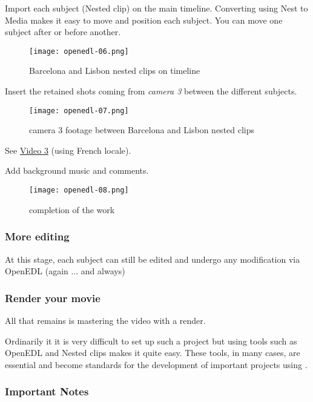 Import each subject (Nested clip) on the main timeline. Converting using Nest to Media makes it easy to move and position each subject. You can move one subject after or before another.

\begin{figure}[htpb]
	\centering
	\texttt{[image: openedl-06.png]}
	\caption{Barcelona and Lisbon nested clips on timeline}
	\label{fig:openedl-06}
\end{figure}

Insert the retained shots coming from \textit{camera 3} between the different subjects.

\begin{figure}[htpb]
	\centering
	\texttt{[image: openedl-07.png]}
	\caption{camera 3 footage between Barcelona and Lisbon nested clips}
	\label{fig:openedl-07}
\end{figure}

See \href{https://youtu.be/9Hz0a-1i3I8}{Video 3} (using French locale).

Add background music and comments.

\begin{figure}[htpb]
	\centering
	\texttt{[image: openedl-08.png]}
	\caption{completion of the work}
	\label{fig:openedl-08}
\end{figure}

\subsubsection*{More editing}
\label{ssub:more_editing}

At this stage, each subject can still be edited and undergo any modification via OpenEDL (again ... and always)

\subsubsection*{Render your movie}
\label{ssub:render_movie}

All that remains is mastering the video with a render.

Ordinarily it it is very difficult to set up such a project but using tools such as OpenEDL and Nested clips makes it quite easy. These tools, in many cases, are essential and become standards for the development of important projects using \CGG{}.

\subsubsection*{Important Notes}
\label{ssub:important_notes}

